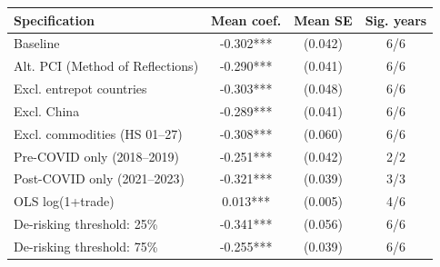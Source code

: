 \begin{tabular}{lccc}
\toprule
Specification & Mean coef. & Mean SE & Sig. years \\
\midrule
Baseline & -0.302*** & (0.042) & 6/6 \\
Alt. PCI (Method of Reflections) & -0.290*** & (0.041) & 6/6 \\
Excl. entrepot countries & -0.303*** & (0.048) & 6/6 \\
Excl. China & -0.289*** & (0.041) & 6/6 \\
Excl. commodities (HS 01--27) & -0.308*** & (0.060) & 6/6 \\
Pre-COVID only (2018--2019) & -0.251*** & (0.042) & 2/2 \\
Post-COVID only (2021--2023) & -0.321*** & (0.039) & 3/3 \\
OLS log(1+trade) & 0.013*** & (0.005) & 4/6 \\
De-risking threshold: 25\% & -0.341*** & (0.056) & 6/6 \\
De-risking threshold: 75\% & -0.255*** & (0.039) & 6/6 \\
\bottomrule
\end{tabular}